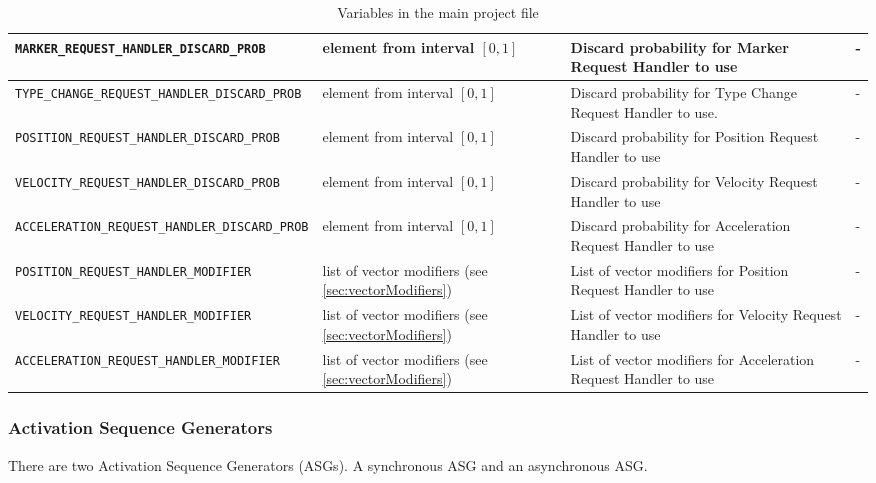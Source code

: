 \begin{sidewaystable}
\begin{tabular}{|l|p{}|p{}|p{}|}
		
		
		 \texttt{MARKER\_REQUEST\_HANDLER\_DISCARD\_PROB} &  element from interval $[0,1]$ & Discard probability for Marker Request Handler to use & -\\\hline
		 
		\texttt{TYPE\_CHANGE\_REQUEST\_HANDLER\_DISCARD\_PROB} & element from interval $[0,1]$ & Discard probability  for Type Change Request Handler to use. & -\\\hline
		
		\texttt{POSITION\_REQUEST\_HANDLER\_DISCARD\_PROB} & element from interval $[0,1]$ & Discard probability  for Position Request Handler to use & -\\\hline

		\texttt{VELOCITY\_REQUEST\_HANDLER\_DISCARD\_PROB} & element from interval $[0,1]$ & Discard probability  for Velocity Request Handler to use & -\\\hline

		\texttt{ACCELERATION\_REQUEST\_HANDLER\_DISCARD\_PROB} & element from interval $[0,1]$ & Discard probability  for Acceleration Request Handler to use & -\\\hline
		
		
		\texttt{POSITION\_REQUEST\_HANDLER\_MODIFIER} & list of vector modifiers (see \ref{sec:vectorModifiers}) & List of vector modifiers for Position Request Handler to use & -\\\hline

		\texttt{VELOCITY\_REQUEST\_HANDLER\_MODIFIER} & list of vector modifiers (see \ref{sec:vectorModifiers}) & List of vector modifiers for Velocity Request Handler to use & -\\\hline

		\texttt{ACCELERATION\_REQUEST\_HANDLER\_MODIFIER} & list of vector modifiers (see \ref{sec:vectorModifiers}) & List of vector modifiers for Acceleration Request Handler to use & -\\\hline		
				
	\end{tabular}
	\caption{Variables in the main project file}\label{tab:mainvars2}
\end{sidewaystable}
\enlargethispage*{2cm}
\thispagestyle{empty}
\clearpage

\subsubsection{Activation Sequence Generators}

There are two Activation Sequence Generators (ASGs). A synchronous ASG and an asynchronous ASG.


